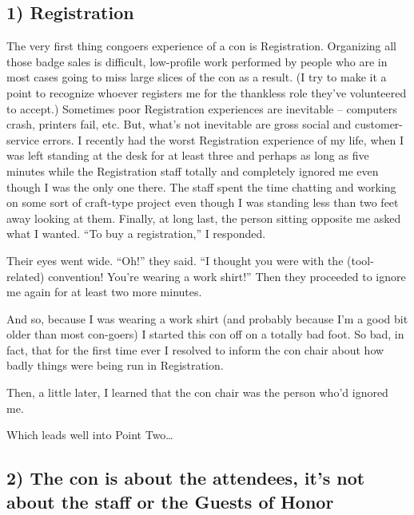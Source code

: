 \subsection*{1) Registration}

The very first thing congoers experience of a con is Registration. Organizing all those badge sales is difficult, low-profile work performed by people who are in most cases going to miss large slices of the con as a result. (I try to make it a point to recognize whoever registers me for the thankless role they've volunteered to accept.) Sometimes poor Registration experiences are inevitable -- computers crash, printers fail, etc. But, what's not inevitable are gross social and customer-service errors. I recently had the worst Registration experience of my life, when I was left standing at the desk for at least three and perhaps as long as five minutes while the Registration staff totally and completely ignored me even though I was the only one there. The staff spent the time chatting and working on some sort of craft-type project even though I was standing less than two feet away looking at them. Finally, at long last, the person sitting opposite me asked what I wanted. ``To buy a registration,'' I responded.

Their eyes went wide. ``Oh!'' they said. ``I thought you were with the (tool-related) convention! You're wearing a work shirt!'' Then they proceeded to ignore me again for at least two more minutes.

And so, because I was wearing a work shirt (and probably because I'm a good bit older than most con-goers) I started this con off on a totally bad foot. So bad, in fact, that for the first time ever I resolved to inform the con chair about how badly things were being run in Registration.

Then, a little later, I learned that the con chair was the person who'd ignored me.

Which leads well into Point Two\ldots

\subsection*{2) The con is about the attendees, it's not about the staff or the Guests of Honor}

